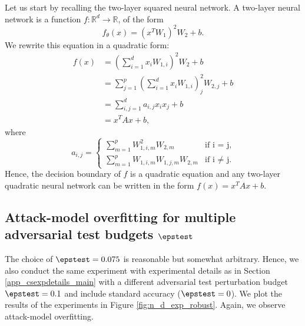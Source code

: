 Let us start by recalling the two-layer squared neural network. A two-layer neural network is a function $f:\mathbb{R}^d\xrightarrow{}\mathbb{R}$, of the form
\begin{equation*}
    f_{\theta}(x) = \left(x^T W_1\right)^2 W_2+b.
\end{equation*}
We rewrite this equation in a quadratic form:
\begin{equation*}
    \begin{split}
        f(x) &= \left(\sum_{i=1}^d x_i W_{1,i}\right)^2 W_2 + b\\
        &= \sum_{j=1}^p\left(\sum_{i=1}^d x_i W_{1,i}\right)^2_j W_{2,j} + b\\
        &= \sum_{i,j = 1}^d a_{i,j}x_i x_j + b\\
        &= x^T A x + b,
    \end{split}
\end{equation*}
where 
\begin{equation*}
    a_{i,j} = \begin{cases}
    \sum_{m=1}^p W_{1,i,m}^2 W_{2,m} & \text{if i = j},\\
    \sum_{m=1}^p W_{1,i,m} W_{1,j,m} W_{2,m} & \text{if i $\neq$ j.}
    \end{cases}
\end{equation*}
Hence, the decision boundary of $f$ is a quadratic equation and any two-layer quadratic neural network can be written in the form $f(x) = x^T A x + b$.


\subsection{Attack-model overfitting for multiple adversarial test budgets $\epstest$}
The choice of $\epstest = 0.075$ is reasonable but somewhat arbitrary. Hence, we also conduct the same experiment with experimental details as in Section \ref{app_csexpdetails_main} with a different adversarial test perturbation budget $\epstest=0.1$ and include standard accuracy ($\epstest=0$). We plot the results of the experiments in Figure \ref{fig:n_d_exp_robust}. Again, we observe attack-model overfitting. 
